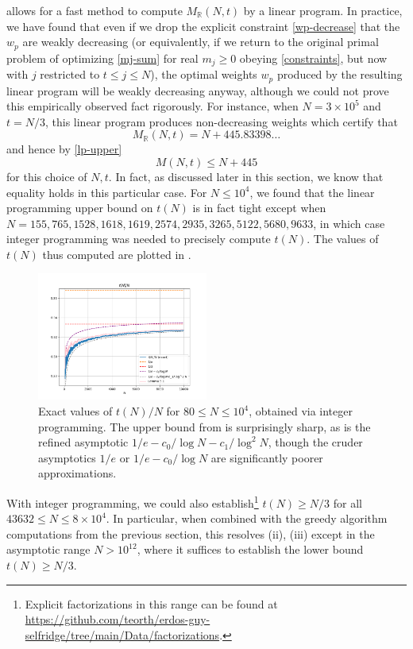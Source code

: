 \documentclass[12pt,a4paper,reqno]{amsart}
\numberwithin{equation}{section}
\theoremstyle{plain}
\theoremstyle{definition}
\newcommand\R{\mathbb{R}}
\begin{document}
 allows for a fast method to compute $M_\R(N,t)$ by a linear program.  In practice, we have found that even if we drop the explicit constraint \eqref{wp-decrease} that the $w_p$ are weakly decreasing (or equivalently, if we return to the original primal problem of optimizing \eqref{mj-sum} for real $m_j \geq 0$ obeying \eqref{constraints}, but now with $j$ restricted to $t \leq j \leq N$), the optimal weights $w_p$ produced by the resulting linear program will be weakly decreasing anyway, although we could not prove this empirically observed fact rigorously.  For instance, when $N = 3 \times 10^5$ and $t = N/3$, this linear program produces non-decreasing weights which certify that
$$ M_\R(N,t) = N + 445.83398\dots$$
and hence by \eqref{lp-upper}
\begin{equation}\label{mnt}
  M(N,t) \leq N + 445
\end{equation}
for this choice of $N,t$.  In fact, as discussed later in this section, we know that equality holds in this particular case.  For $N \leq 10^4$, we found that the linear programming upper bound on $t(N)$ is in fact tight except when
$N=155,765,1528,1618,1619,2574,2935,3265,5122,5680,9633$, in which case integer programming was needed to precisely compute $t(N)$.  The values of $t(N)$ thus computed are  plotted in .

\begin{figure}
  \centering
  \includegraphics[width=0.5\textwidth]{longplot.png}
  \caption{Exact values of $t(N)/N$ for $80 \leq N \leq 10^4$, obtained via integer programming.  The upper bound from  is surprisingly sharp, as is the refined asymptotic $1/e - c_0/\log N - c_1/\log^2 N$, though the cruder asymptotics $1/e$ or $1/e - c_0/\log N$ are significantly poorer approximations.}
  \label{fig-long}
  \end{figure}


With integer programming, we could also establish\footnote{Explicit factorizations in this range can be found at \url{https://github.com/teorth/erdos-guy-selfridge/tree/main/Data/factorizations}.} $t(N) \geq N/3$ for all $43632 \leq N \leq 8 \times 10^4$. 
  In particular, when combined with the greedy algorithm computations from the previous section, this resolves (ii), (iii) except in the asymptotic range $N > 10^{12}$, where it suffices to establish the lower bound $t(N) \geq N/3$.
\end{document}
